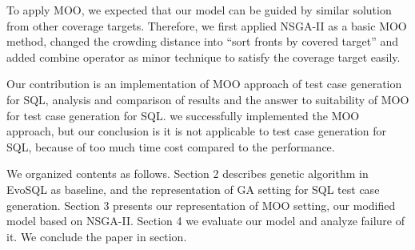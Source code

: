 To apply MOO, we expected that our model can be guided by similar solution from other coverage targets. Therefore, we first applied NSGA-II\cite{deb2002fast} as a basic MOO method, changed the crowding distance into ``sort fronts by covered target'' and added combine operator as minor technique to satisfy the coverage target easily.
 

Our contribution is an implementation of MOO approach of test case generation for SQL, analysis and comparison of results and the answer to suitability of MOO for test case generation for SQL. we successfully implemented the MOO approach, but our conclusion is it is not applicable to test case generation for SQL, because of too much time cost compared to the performance.

 
We organized contents as follows. Section 2 describes genetic algorithm in EvoSQL as baseline, and the representation of GA setting for SQL test case generation. Section 3 presents our representation of MOO setting, our modified model based on NSGA-II. Section 4 we evaluate our model and analyze failure of it. We conclude the paper in section.
